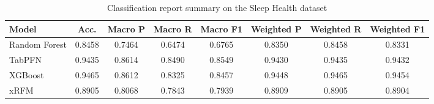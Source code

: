 \begin{table}[H]
  \centering
  \caption{Classification report summary on the Sleep Health dataset}
  \small
  \begin{tabular}{lccccccc}
    \toprule
    \textbf{Model} & \textbf{Acc.} 
    & \textbf{Macro P} & \textbf{Macro R} & \textbf{Macro F1}
    & \textbf{Weighted P} & \textbf{Weighted R} & \textbf{Weighted F1} \\
    \midrule
    Random Forest & 0.8458 & 0.7464 & 0.6474 & 0.6765 & 0.8350 & 0.8458 & 0.8331 \\
    TabPFN        & 0.9435 & 0.8614 & 0.8490 & 0.8549 & 0.9430 & 0.9435 & 0.9432 \\
    XGBoost       & 0.9465 & 0.8612 & 0.8325 & 0.8457 & 0.9448 & 0.9465 & 0.9454 \\
    xRFM          & 0.8905 & 0.8068 & 0.7843 & 0.7939 & 0.8909 & 0.8905 & 0.8904 \\
    \bottomrule
  \end{tabular}
  \label{tab:sleep_health_classification_report}
\end{table}